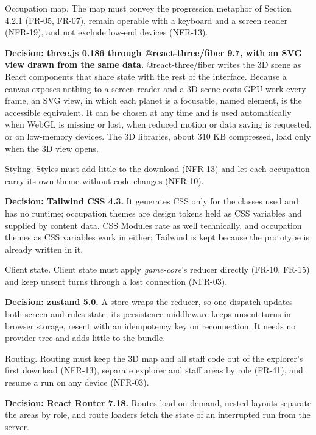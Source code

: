 Occupation map. The map must convey the progression metaphor of Section 4.2.1 (FR-05, FR-07), remain operable with a keyboard and a screen reader (NFR-19), and not exclude low-end devices (NFR-13).

\textbf{Decision: three.js 0.186 through @\allowbreak{}react-\allowbreak{}three/\allowbreak{}fiber 9.7, with an SVG view drawn from the same data.} @\allowbreak{}react-\allowbreak{}three/\allowbreak{}fiber writes the 3D scene as React components that share state with the rest of the interface\cite{r138}. Because a canvas exposes nothing to a screen reader and a 3D scene costs GPU work every frame\cite{r139}, an SVG view, in which each planet is a focusable, named element\cite{r140}, is the accessible equivalent. It can be chosen at any time and is used automatically when WebGL is missing or lost, when reduced motion or data saving is requested, or on low-memory devices. The 3D libraries, about 310 KB compressed, load only when the 3D view opens.

Styling. Styles must add little to the download (NFR-13) and let each occupation carry its own theme without code changes (NFR-10).

\textbf{Decision: Tailwind CSS 4.3.} It generates CSS only for the classes used and has no runtime\cite{r141}; occupation themes are design tokens held as CSS variables and supplied by content data. CSS Modules rate as well technically, and occupation themes as CSS variables work in either; Tailwind is kept because the prototype is already written in it.

Client state. Client state must apply \textit{game-\allowbreak{}core}'s reducer directly (FR-10, FR-15) and keep unsent turns through a lost connection (NFR-03).

\textbf{Decision: zustand 5.0.} A store wraps the reducer, so one dispatch updates both screen and rules state; its persistence middleware keeps unsent turns in browser storage, resent with an idempotency key on reconnection\cite{r142}. It needs no provider tree and adds little to the bundle.

Routing. Routing must keep the 3D map and all staff code out of the explorer's first download (NFR-13), separate explorer and staff areas by role (FR-41), and resume a run on any device (NFR-03).

\textbf{Decision: React Router 7.18.} Routes load on demand, nested layouts separate the areas by role, and route loaders fetch the state of an interrupted run from the server\cite{r143}.

